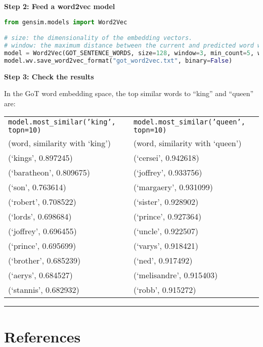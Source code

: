 \textbf{Step 2: Feed a word2vec model}

\begin{lstlisting}[language=Python]
from gensim.models import Word2Vec

# size: the dimensionality of the embedding vectors.
# window: the maximum distance between the current and predicted word within a sentence.
model = Word2Vec(GOT_SENTENCE_WORDS, size=128, window=3, min_count=5, workers=4)
model.wv.save_word2vec_format("got_word2vec.txt", binary=False)
\end{lstlisting}

\textbf{Step 3: Check the results}

In the GoT word embedding space, the top similar words to ``king'' and ``queen'' are:

\begin{center}
\begin{tabular}{ll}
\texttt{model.most\_similar('king', topn=10)} & \texttt{model.most\_similar('queen', topn=10)} \\
(word, similarity with `king') & (word, similarity with `queen') \\
\hline
(`kings', 0.897245) & (`cersei', 0.942618) \\
(`baratheon', 0.809675) & (`joffrey', 0.933756) \\
(`son', 0.763614) & (`margaery', 0.931099) \\
(`robert', 0.708522) & (`sister', 0.928902) \\
(`lords', 0.698684) & (`prince', 0.927364) \\
(`joffrey', 0.696455) & (`uncle', 0.922507) \\
(`prince', 0.695699) & (`varys', 0.918421) \\
(`brother', 0.685239) & (`ned', 0.917492) \\
(`aerys', 0.684527) & (`melisandre', 0.915403) \\
(`stannis', 0.682932) & (`robb', 0.915272) \\
\end{tabular}
\end{center}

\hrule


\section{References}

